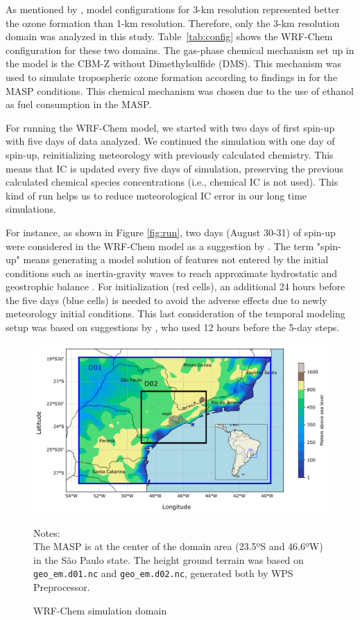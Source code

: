 As mentioned by \citet{Vara2013}, model configurations for 3-km resolution represented better the ozone formation than 1-km resolution.
Therefore, only the 3-km resolution domain was analyzed in this study.
Table~\ref{tab:config} shows the WRF-Chem configuration for these two domains.
The gas-phase chemical mechanism set up in the model is the CBM-Z \citep{Zaveri1999} without Dimethylsulfide (DMS). 
This mechanism was used to simulate tropospheric ozone formation according to findings in \citet{Andrade2015, Gavidia2018} for the MASP conditions. 
This chemical mechanism was chosen due to the use of ethanol as fuel consumption in the MASP.

For running the WRF-Chem model, we started with two days of first spin-up with five days of data analyzed.
We continued the simulation with one day of spin-up, reinitializing meteorology with previously calculated chemistry.
This means that IC is updated every five days of simulation, preserving the previous calculated chemical species concentrations (i.e., chemical IC is not used).
This kind of run helps us to reduce meteorological IC error in our long time simulations.

For instance, as shown in Figure \ref{fig:run}, two days (August 30-31) of spin-up were considered in the WRF-Chem model as a suggestion by \citet{Warner2011}.
The term "spin-up" means generating a model solution of features not entered by the initial conditions such as inertia-gravity waves to reach approximate hydrostatic and geostrophic balance \citep{Warner2011}.
For initialization (red cells), an additional 24 hours before the five days (blue cells) is needed to avoid the adverse effects due to newly meteorology initial conditions.
This last consideration of the temporal modeling setup was based on suggestions by \citet{Ritter2013}, who used 12 hours before the 5-day steps.

\newpage

	
\begin{figure}[htbp]
  \includegraphics[width=1\textwidth]{fig/Domain.pdf} %
  \caption{WRF-Chem simulation domain}
  {\scriptsize Notes: \\ The MASP is at the center of the domain area (23.5ºS and 46.6ºW) in the São Paulo state. The height ground terrain was based on \verb|geo_em.d01.nc| and \verb|geo_em.d02.nc|, generated both by WPS Preprocessor.}
  \label{fig:domain_area}
\end{figure}

